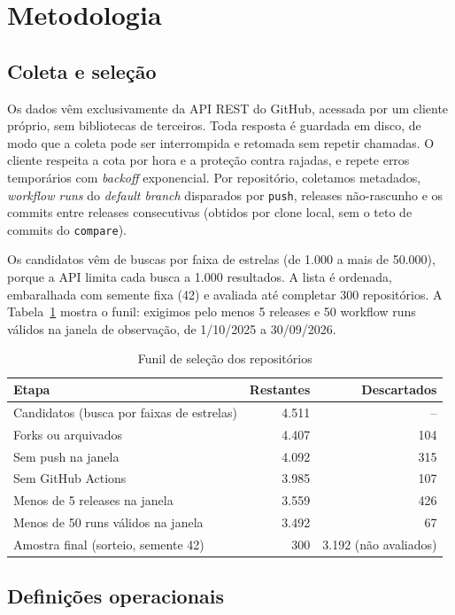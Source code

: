 \documentclass[12pt]{article}
\begin{document}
\section{Metodologia}

\subsection{Coleta e seleção}

Os dados vêm exclusivamente da API REST do GitHub, acessada por um cliente
próprio, sem bibliotecas de terceiros. Toda resposta é guardada em disco, de
modo que a coleta pode ser interrompida e retomada sem repetir chamadas. O
cliente respeita a cota por hora e a proteção contra rajadas, e repete erros
temporários com \emph{backoff} exponencial. Por repositório, coletamos
metadados, \emph{workflow runs} do \emph{default branch} disparados por
\texttt{push}, releases não-rascunho e os commits entre releases consecutivas
(obtidos por clone local, sem o teto de commits do \texttt{compare}).

Os candidatos vêm de buscas por faixa de estrelas (de 1.000 a mais de 50.000),
porque a API limita cada busca a 1.000 resultados. A lista é ordenada,
embaralhada com semente fixa (42) e avaliada até completar 300 repositórios. A
Tabela~\ref{tab:funil} mostra o funil: exigimos pelo menos 5 releases e 50
workflow runs válidos na janela de observação, de 1/10/2025 a 30/09/2026.

\begin{table}[ht]
\centering
\caption{Funil de seleção dos repositórios}
\label{tab:funil}
\small
\begin{tabular}{lrr}
\toprule
Etapa & Restantes & Descartados \\
\midrule
Candidatos (busca por faixas de estrelas) & 4.511 & -- \\
Forks ou arquivados & 4.407 & 104 \\
Sem push na janela & 4.092 & 315 \\
Sem GitHub Actions & 3.985 & 107 \\
Menos de 5 releases na janela & 3.559 & 426 \\
Menos de 50 runs válidos na janela & 3.492 & 67 \\
Amostra final (sorteio, semente 42) & 300 & 3.192 (não avaliados) \\
\bottomrule
\end{tabular}
\end{table}

\subsection{Definições operacionais}
\end{document}
